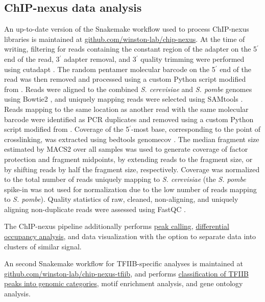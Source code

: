 \subsection{ChIP-nexus data analysis}
An up-to-date version of the Snakemake \citep{koster2012} workflow used to process ChIP-nexus libraries is maintained at \href{https://github.com/winston-lab/chip-nexus}{github.com/winston-lab/chip-nexus}.
At the time of writing, filtering for reads containing the constant region of the adapter on the 5$^\prime$ end of the read, 3$^\prime$ adapter removal, and 3$^\prime$ quality trimming were performed using cutadapt \citep{martin2011}.
The random pentamer molecular barcode on the 5$^\prime$ end of the read was then removed and processed using a custom Python script modified from \citet{mayer2015}.
Reads were aligned to the combined \textit{S. cerevisiae} and \textit{S. pombe} genomes using Bowtie2 \citep{langmead2012}, and uniquely mapping reads were selected using SAMtools \citep{li2009}.
Reads mapping to the same location as another read with the same molecular barcode were identified as PCR duplicates and removed using a custom Python script modified from \citet{mayer2015}.
Coverage of the 5$^\prime$-most base, corresponding to the point of crosslinking, was extracted using bedtools genomecov \citep{quinlan2010}.
The median fragment size estimated by MACS2 \citep{zhang2008} over all samples was used to generate coverage of factor protection and fragment midpoints, by extending reads to the fragment size, or by shifting reads by half the fragment size, respectively.
Coverage was normalized to the total number of reads uniquely mapping to \textit{S. cerevisiae} (the \textit{S. pombe} spike-in was not used for normalization due to the low number of reads mapping to \textit{S. pombe}).
Quality statistics of raw, cleaned, non-aligning, and uniquely aligning non-duplicate reads were assessed using FastQC \citep{andrews2010}.

The ChIP-nexus pipeline additionally performs \hyperref[subsubsec:nexus_peak_calling]{peak calling}, \hyperref[subsubsec:nexus_differential_occupancy]{differential occupancy analysis}, and data visualization with the option to separate data into clusters of similar signal.

An second Snakemake workflow for TFIIB-specific analyses is maintained at\\\href{https://github.com/winston-lab/chip-nexus-tfiib}{github.com/winston-lab/chip-nexus-tfiib}, and performs \hyperref[subsubsec:tfiib_peak_classification]{classification of TFIIB peaks into genomic categories}, motif enrichment analysis, and gene ontology analysis.

